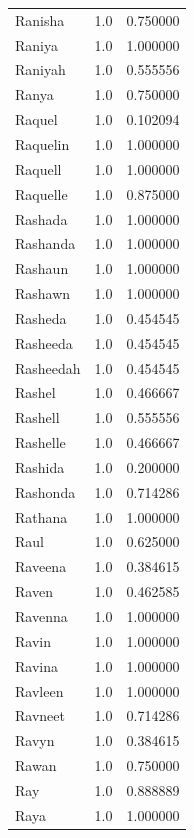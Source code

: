\documentclass[
  letterpaper,
  DIV=11,
  numbers=noendperiod]{scrreprt}
\begin{document}
\begin{tabular}{lrr}
Ranisha         &   1.0 &   0.750000 \\
Raniya          &   1.0 &   1.000000 \\
Raniyah         &   1.0 &   0.555556 \\
Ranya           &   1.0 &   0.750000 \\
Raquel          &   1.0 &   0.102094 \\
Raquelin        &   1.0 &   1.000000 \\
Raquell         &   1.0 &   1.000000 \\
Raquelle        &   1.0 &   0.875000 \\
Rashada         &   1.0 &   1.000000 \\
Rashanda        &   1.0 &   1.000000 \\
Rashaun         &   1.0 &   1.000000 \\
Rashawn         &   1.0 &   1.000000 \\
Rasheda         &   1.0 &   0.454545 \\
Rasheeda        &   1.0 &   0.454545 \\
Rasheedah       &   1.0 &   0.454545 \\
Rashel          &   1.0 &   0.466667 \\
Rashell         &   1.0 &   0.555556 \\
Rashelle        &   1.0 &   0.466667 \\
Rashida         &   1.0 &   0.200000 \\
Rashonda        &   1.0 &   0.714286 \\
Rathana         &   1.0 &   1.000000 \\
Raul            &   1.0 &   0.625000 \\
Raveena         &   1.0 &   0.384615 \\
Raven           &   1.0 &   0.462585 \\
Ravenna         &   1.0 &   1.000000 \\
Ravin           &   1.0 &   1.000000 \\
Ravina          &   1.0 &   1.000000 \\
Ravleen         &   1.0 &   1.000000 \\
Ravneet         &   1.0 &   0.714286 \\
Ravyn           &   1.0 &   0.384615 \\
Rawan           &   1.0 &   0.750000 \\
Ray             &   1.0 &   0.888889 \\
Raya            &   1.0 &   1.000000 \\

\end{tabular}
\end{document}
